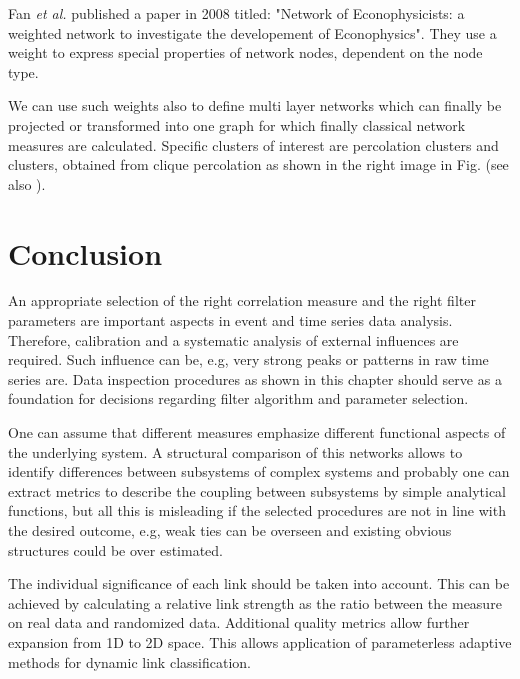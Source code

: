 \documentclass[a4paper,10pt]{scrbook}
\begin{document}



%
%

Fan \textit{et al.} published a paper in 2008 titled: "Network of Econophysicists: a weighted network to investigate the developement of Econophysics". They use a weight to express special properties of network nodes, dependent on the node type.

We can use such weights also to define multi layer networks which can finally be projected or transformed into one graph for which finally classical network measures are calculated. Specific clusters of interest are percolation clusters and clusters, obtained from clique percolation as shown in the right image in Fig. (see also \cite{PalEtAl05}). 

\label{ext.fig.PercolationTypes2} 


\section{Conclusion}

An appropriate selection of the right correlation measure and the right filter parameters are important aspects in event and time series data analysis. Therefore, calibration and a systematic analysis of external influences are required. Such influence can be, e.g, very strong peaks or patterns in raw time series are. Data inspection procedures as shown in this chapter should serve as a foundation for decisions regarding filter algorithm and parameter selection. 

One can assume that different measures emphasize different functional aspects of the underlying system. A structural comparison of this networks allows to identify differences between subsystems of complex systems and probably one can extract metrics to describe the coupling between subsystems by simple analytical functions, but all this is misleading if the selected procedures are not in line with the desired outcome, e.g, weak ties can be overseen and existing obvious structures could be over estimated. 

The individual significance of each link should be taken into account. This can be achieved by calculating a relative link strength as the ratio between the measure on real data and randomized data. Additional quality metrics allow further expansion from 1D to 2D space. This allows application of parameterless adaptive methods for dynamic link classification.
\end{document}
